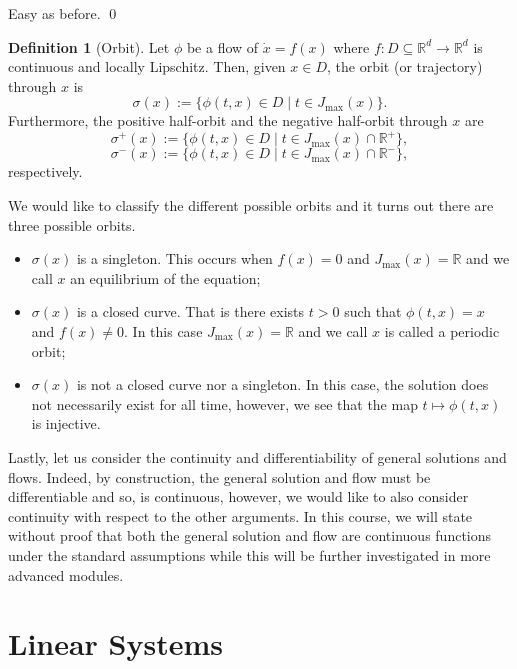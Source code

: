 \documentclass[
]{article}
\theoremstyle{definition}
\theoremstyle{definition}
\newtheorem{definition}{Definition}[section]
\begin{document}
Easy as before. \qed

\begin{definition}[Orbit]
  Let \(\phi\) be a flow of \(\dot x = f(x)\) where \(f : D \subseteq \mathbb{R}^d 
  \to \mathbb{R}^d\) is continuous and locally Lipschitz. Then, given \(x \in D\), 
  the orbit (or trajectory) through \(x\) is 
  \[\sigma(x) := \{\phi(t, x) \in D \mid t \in J_{\max}(x)\}.\]
  Furthermore, the positive half-orbit and the negative half-orbit through \(x\) 
  are 
  \[\sigma^+(x) := \{\phi(t, x) \in D \mid t \in J_{\max}(x) \cap \mathbb{R}^+\},\]
  \[\sigma^-(x) := \{\phi(t, x) \in D \mid t \in J_{\max}(x) \cap \mathbb{R}^-\},\]
  respectively.
\end{definition}

We would like to classify the different possible orbits and it turns out
there are three possible orbits.

\begin{itemize}
  \item \(\sigma(x)\) is a singleton. This occurs when \(f(x) = 0\) and 
    \(J_{\max}(x) = \mathbb{R}\) and we call \(x\) an equilibrium of the equation;
  \item \(\sigma(x)\) is a closed curve. That is there exists \(t > 0\) such that 
    \(\phi(t, x) = x\) and \(f(x) \neq 0\). In this case \(J_{\max}(x) = \mathbb{R}\) 
    and we call \(x\) is called a periodic orbit;
  \item \(\sigma(x)\) is not a closed curve nor a singleton. In this case, the 
    solution does not necessarily exist for all time, however, we see that the 
    map \(t \mapsto \phi(t, x)\) is injective.
\end{itemize}

Lastly, let us consider the continuity and differentiability of general
solutions and flows. Indeed, by construction, the general solution and
flow must be differentiable and so, is continuous, however, we would
like to also consider continuity with respect to the other arguments. In
this course, we will state without proof that both the general solution
and flow are continuous functions under the standard assumptions while
this will be further investigated in more advanced modules.

\newpage

\hypertarget{linear-systems}{%
\section{Linear Systems}\label{linear-systems}}
\end{document}
